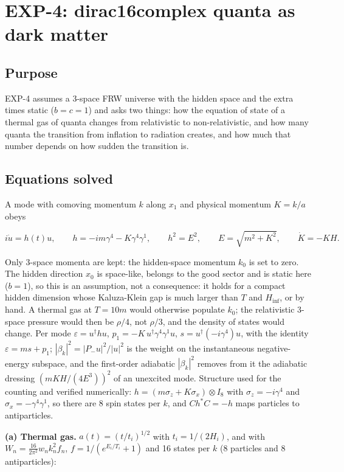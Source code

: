 \documentclass[11pt]{article}
\begin{document}
\section{EXP-4: dirac16complex quanta as dark matter}

\subsection{Purpose}

EXP-4 assumes a 3-space FRW universe with the hidden space and the extra times static ($b=c=1$) and asks two things: how the equation of state of a thermal gas of quanta changes from relativistic to non-relativistic, and how many quanta the transition from inflation to radiation creates, and how much that number depends on how sudden the transition is.

\subsection{Equations solved}

A mode with comoving momentum $k$ along $x_1$ and physical momentum $K=k/a$ obeys

\[
i\dot u=h(t)u,\qquad h=-im\gamma^4-K\gamma^4\gamma^1,\qquad h^2=E^2,\qquad E=\sqrt{m^2+K^2},\qquad \dot K=-KH .
\]

Only 3-space momenta are kept: the hidden-space momentum $k_0$ is set to zero. The hidden direction $x_0$ is space-like, belongs to the good sector and is static here ($b=1$), so this is an assumption, not a consequence: it holds for a compact hidden dimension whose Kaluza-Klein gap is much larger than $T$ and $H_{\mathrm{inf}}$, or by hand. A thermal gas at $T=10m$ would otherwise populate $k_0$; the relativistic 3-space pressure would then be $\rho/4$, not $\rho/3$, and the density of states would change. Per mode $\varepsilon=u^\dagger hu$, $p_1=-K\,u^\dagger\gamma^4\gamma^1u$, $s=u^\dagger(-i\gamma^4)u$, with the identity $\varepsilon=ms+p_1$; $|\beta_k|^2=|P_-u|^2/|u|^2$ is the weight on the instantaneous negative-energy subspace, and the first-order adiabatic $|\beta_k|^2$ removes from it the adiabatic dressing $(mKH/(4E^3))^2$ of an unexcited mode. Structure used for the counting and verified numerically: $h=(m\sigma_z+K\sigma_x)\otimes I_8$ with $\sigma_z=-i\gamma^4$ and $\sigma_x=-\gamma^4\gamma^1$, so there are 8 spin states per $k$, and $Ch^\ast C=-h$ maps particles to antiparticles.

\textbf{(a) Thermal gas.} $a(t)=(t/t_i)^{1/2}$ with $t_i=1/(2H_i)$, and with $W_n=\tfrac{16}{2\pi^2}w_nk_n^2f_n$, $f=1/(e^{E_i/T_i}+1)$ and 16 states per $k$ (8 particles and 8 antiparticles):
\end{document}
